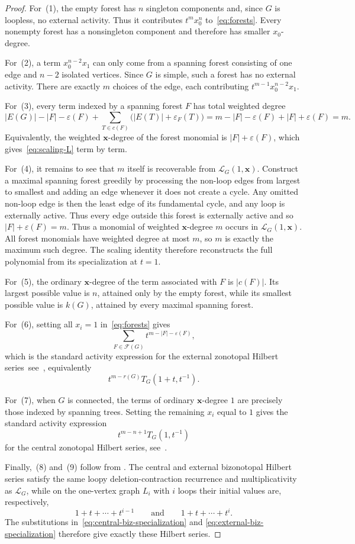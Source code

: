\documentclass[11pt]{article}
\theoremstyle{plain}
\theoremstyle{definition}
\renewcommand{\mathcal}{\mathscr}
\newcommand{\LL}{\mathcal{L}}    %
\newcommand{\cF}{\mathcal{F}}    %
\newcommand{\bx}{\mathbf{x}}
\newcommand{\eps}{\varepsilon}
\numberwithin{equation}{section}
\begin{document}
\begin{proof}
 For~(1), the empty forest has $n$ singleton components and, since $G$ is loopless, no external activity.  Thus it contributes $t^m x_0^n$ to~\eqref{eq:forests}.  Every nonempty
forest has a nonsingleton component and therefore has smaller $x_0$-degree.

For~(2), a term $x_0^{n-2}x_1$ can only come from a spanning forest consisting
of one edge and $n-2$ isolated vertices.  Since $G$ is simple, such a forest
has no external activity.  There are exactly $m$ choices of the edge, each
contributing $t^{m-1}x_0^{n-2}x_1$.

For~(3), every term indexed by a spanning forest $F$ has total weighted degree
\[
|E(G)|-|F|-\eps(F)  +\sum_{T\in c(F)}
 \bigl(|E(T)|+\eps_F(T)\bigr)
= m-|F|-\eps(F)+|F|+\eps(F) = m.
\]
Equivalently, the weighted $\bx$-degree of the forest monomial is
$|F|+\eps(F)$, which gives~\eqref{eq:scaling-L} term by term.

For~(4), it remains to see that $m$ itself is recoverable from
$\LL_G(1,\bx)$.
Construct a maximal spanning forest greedily by processing the non-loop edges
from largest to smallest and adding an edge whenever it does not create a
cycle.  Any omitted non-loop edge is then the least edge of its fundamental cycle, and any loop is externally active.  Thus every edge outside this
 forest is externally active and so
  $ |F|+\eps(F)=m.$
Thus a monomial of weighted $\bx$-degree $m$ occurs in $\LL_G(1,\bx)$.
All forest monomials have weighted degree at most $m$, so $m$ is exactly the
maximum such degree.  The scaling identity therefore reconstructs the full
polynomial from its specialization at $t=1$.

For~(5), the ordinary $\bx$-degree of the term associated with $F$ is
$|c(F)|$.  Its largest possible value is $n$, attained only by the empty
forest, while its smallest possible value is $k(G)$, attained by every maximal
spanning forest.

For~(6), setting all $x_i=1$ in~\eqref{eq:forests} gives
\[
   \sum_{F\in\cF(G)}
   t^{m-|F|-\eps(F)},
\]
which is the standard activity expression for the external zonotopal Hilbert
series~see~\cite{PSS,HR}, equivalently
\[
   t^{m-r(G)}T_G(1+t,t^{-1}).
\]

For~(7), when $G$ is connected, the terms of ordinary $\bx$-degree $1$ are
precisely those indexed by spanning trees.  Setting the remaining $x_i$ equal
to $1$ gives the standard activity expression
\[
   t^{m-n+1}T_G(1,t^{-1})
\]
for the central zonotopal Hilbert series, see~\cite{PS,HR}.

Finally,~(8) and~(9) follow from \cite[Theorem~3.6]{KNSV}.  The central and external bizonotopal Hilbert
series satisfy the same loopy deletion-contraction recurrence and multiplicativity as $\LL_G$,
while on the one-vertex graph $L_i$ with $i$ loops their initial values are, respectively,
\[
   1+t+\cdots+t^{i-1}
   \qquad\text{and}\qquad
   1+t+\cdots+t^i.
\]
The substitutions in~\eqref{eq:central-biz-specialization} and
\eqref{eq:external-biz-specialization} therefore give exactly these Hilbert
series.
\end{proof}
\end{document}
